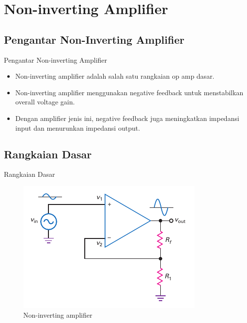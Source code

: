 \section{Non-inverting Amplifier}


\subsection{Pengantar Non-Inverting Amplifier}

\begin{frame}{Pengantar Non-inverting Amplifier}
	\begin{itemize}
		\item Non-inverting amplifier adalah salah satu rangkaian op amp dasar.
		\item Non-inverting amplifier menggunakan negative feedback untuk menstabilkan overall voltage gain.
		\item Dengan amplifier jenis ini, negative feedback juga meningkatkan impedansi input dan menurunkan impedansi output.
	\end{itemize}
\end{frame}



\subsection{Rangkaian Dasar}
\begin{frame}{Rangkaian Dasar}
	\begin{figure}
		\centering
		\includegraphics[width=0.5\linewidth]{gambar/fig-16.18}
		\caption{Non-inverting amplifier}
		\label{fig-16.18}
	\end{figure}
\end{frame}

